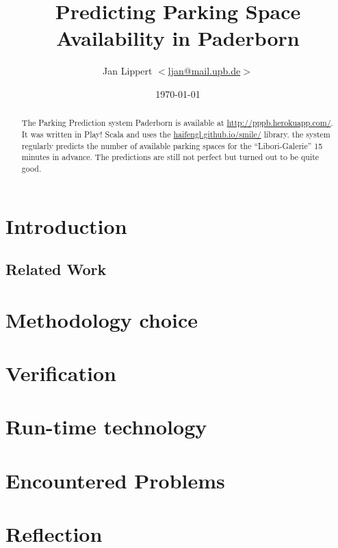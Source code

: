 \documentclass[journal,10pt]{IEEEtran}
\author{Jan Lippert \(<\)\href{mailto:ljan@mail.upb.de}{ljan@mail.upb.de}\(>\)}
\date{\today}
\begin{document}
\title{Predicting Parking Space Availability in Paderborn}
\maketitle

\begin{abstract}
The Parking Prediction system Paderborn is available at \url{http://pppb.herokuapp.com/}. It was written in Play! Scala and uses the \href{smile}{haifengl.github.io/smile/} library. the system regularly predicts the number of available parking spaces for the ``Libori-Galerie'' 15 minutes in advance. The predictions are still not perfect but turned out to be quite good.
\end{abstract}

\section{Introduction}


\subsection{Related Work}


\section{Methodology choice}


\section{Verification}


\section{Run-time technology}


\section{Encountered Problems}\label{sec:challenges}


\section{Reflection}



  

\end{document}
